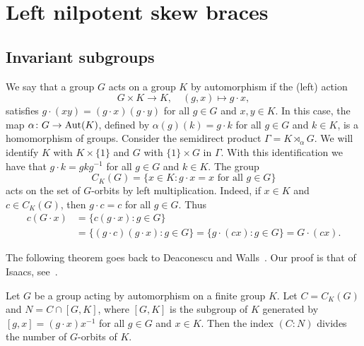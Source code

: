 \chapter{Left nilpotent skew braces}

\label{invariant}

\section{Invariant subgroups}

We say that a group $G$ acts on a group $K$ by automorphism if the (left) action
\[
G\times K\to K,
\quad
(g,x)\mapsto g\cdot x,
\]
satisfies $g\cdot (xy)=(g\cdot x)(g\cdot y)$ 
for all $g\in G$ and $x,y\in K$. In this case, the map $\alpha\colon G\to\operatorname{Aut}(K)$, defined by $\alpha(g)(k)=g\cdot k$ for all $g\in G$ and $k\in K$, is a homomorphism of groups. Consider the semidirect product $\Gamma=K\rtimes_{\alpha} G$. We will identify $K$ with $K\times \{ 1\}$ and $G$ with $\{ 1\}\times G$ in $\Gamma$. With this identification we have that $g\cdot k=gkg^{-1}$ for all $g\in G$ and $k\in K$. 
The group 
\[
C_{K}(G)=\{x\in K:g\cdot x=x\text{ for all }g\in G\}
\]
acts on the 
set of $G$-orbits by left multiplication. Indeed, if $x\in K$ and $c\in C_K(G)$, then $g\cdot c=c$ for all $g\in G$. Thus  
\begin{align*}
  c(G\cdot x)
  &=\{c(g\cdot x):g\in G\}\\
  &=\{(g\cdot c)(g\cdot x):g\in G\}
  =\{g\cdot (cx):g\in G\}
  =G\cdot (cx).
\end{align*}

The following theorem goes back to Deaconescu and Walls~\cite{MR2164558}. 
Our proof is that of Isaacs, see~\cite{MR2922681}. 

\begin{theorem}
	\label{thm:DeaconescuWalls}
	Let $G$ be a group acting by automorphism on a finite group $K$. Let
	$C=C_{K}(G)$ and $N=C\cap [G,K]$,
	where $[G,K]$ is the subgroup of $K$ generated by $[g,x]=(g\cdot x)x^{-1}$ for all
	$g\in G$ and $x\in K$. Then the index $(C:N)$ divides the number of $G$-orbits of 
	$K$. 
\end{theorem}

%


